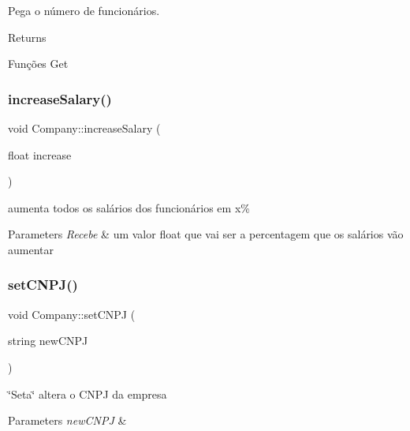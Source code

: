 Pega o número de funcionários. 

\begin{DoxyReturn}{Returns}

\end{DoxyReturn}
Funções Get \mbox{\label{classCompany_a985eb03c73d5e466f302793b34bf7a75}} 
\subsubsection{\texorpdfstring{increase\+Salary()}{increaseSalary()}}
{\footnotesize\ttfamily void Company\+::increase\+Salary (\begin{DoxyParamCaption}\item[{float}]{increase }\end{DoxyParamCaption})}



aumenta todos os salários dos funcionários em x\% 


\begin{DoxyParams}{Parameters}
{\em Recebe} & um valor float que vai ser a percentagem que os salários vão aumentar \\
\hline
\end{DoxyParams}
\mbox{\label{classCompany_a1888646ae85790bcf2f9e0bc6c7a20cd}} 
\subsubsection{\texorpdfstring{set\+C\+N\+P\+J()}{setCNPJ()}}
{\footnotesize\ttfamily void Company\+::set\+C\+N\+PJ (\begin{DoxyParamCaption}\item[{string}]{new\+C\+N\+PJ }\end{DoxyParamCaption})}



\char`\"{}\+Seta\char`\"{} altera o C\+N\+PJ da empresa 


\begin{DoxyParams}{Parameters}
{\em new\+C\+N\+PJ} & \\
\hline
\end{DoxyParams}
\mbox{\label{classCompany_a46acdc3e02c9a4ffed15d8c21a16f36f}} 
